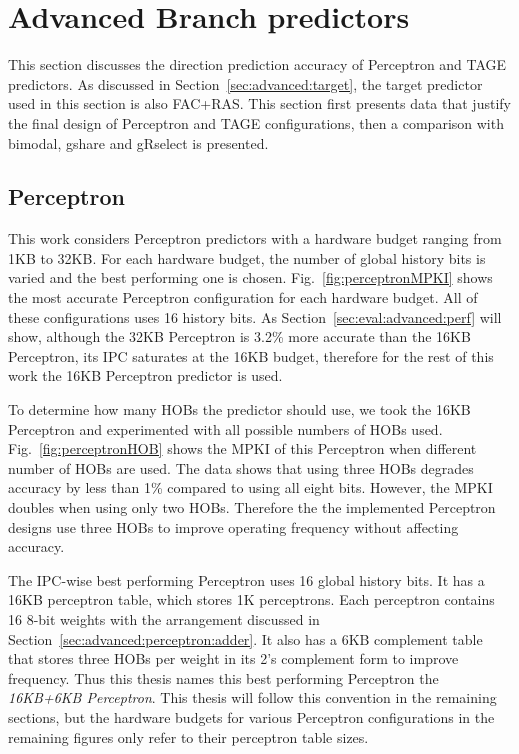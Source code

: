 \section{Advanced Branch predictors}
\label{sec:eval:advanced}
This section discusses the direction prediction accuracy of Perceptron and TAGE predictors. As discussed in Section~\ref{sec:advanced:target}, the target predictor used in this section is also FAC+RAS. This section first presents data that justify the final design of Perceptron and TAGE configurations, then a comparison with bimodal, gshare and gRselect is presented.

\subsection{Perceptron}
\label{sec:eval:advanced:perceptron}
This work considers Perceptron predictors with a hardware budget ranging from 1KB to 32KB. For each hardware budget, the number of global history bits is varied and the best performing one is chosen. Fig.~\ref{fig:perceptronMPKI} shows the most accurate Perceptron configuration for each hardware budget. All of these configurations uses 16 history bits. As Section~\ref{sec:eval:advanced:perf} will show, although the 32KB Perceptron is 3.2\% more accurate than the 16KB Perceptron, its IPC saturates at the 16KB budget, therefore for the rest of this work the 16KB Perceptron predictor is used.

To determine how many HOBs the predictor should use, we took the 16KB Perceptron and experimented with all possible numbers of HOBs used. Fig.~\ref{fig:perceptronHOB} shows the MPKI of this Perceptron when different number of HOBs are used. The data shows that using three HOBs degrades accuracy by less than 1\% compared to using all eight bits. However, the MPKI doubles when using only two HOBs. Therefore the the implemented Perceptron designs use three HOBs to improve operating frequency without affecting accuracy.

The IPC-wise best performing Perceptron uses 16 global history bits. It has a 16KB perceptron table, which stores 1K perceptrons. Each perceptron contains 16 8-bit weights with the arrangement discussed in Section~\ref{sec:advanced:perceptron:adder}. It also has a 6KB complement table that stores three HOBs per weight in its 2's complement form to improve frequency. Thus this thesis names this best performing Perceptron the \textit{16KB+6KB Perceptron}. This thesis will follow this convention in the remaining sections, but the hardware budgets for various Perceptron configurations in the remaining figures only refer to their perceptron table sizes.

